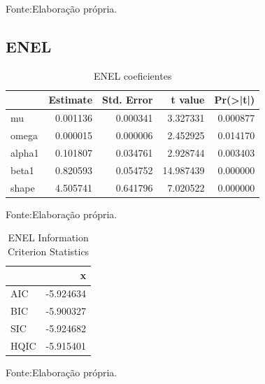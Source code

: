 \documentclass[
  12pt,
  a4paper,
  openany]{book}
\begin{document}
Fonte:Elaboração própria.

\justifying
\bigskip

\hypertarget{enel}{%
\subsection{ENEL}\label{enel}}

\begin{table}[!h]

\caption{\label{tab:unnamed-chunk-22}ENEL coeficientes}
\centering
\begin{tabular}[t]{lrrrr}
\toprule
  &  Estimate &  Std. Error &  t value & Pr(>|t|)\\
\midrule
mu & 0.001136 & 0.000341 & 3.327331 & 0.000877\\
omega & 0.000015 & 0.000006 & 2.452925 & 0.014170\\
alpha1 & 0.101807 & 0.034761 & 2.928744 & 0.003403\\
beta1 & 0.820593 & 0.054752 & 14.987439 & 0.000000\\
shape & 4.505741 & 0.641796 & 7.020522 & 0.000000\\
\bottomrule
\end{tabular}
\end{table}
\FloatBarrier
\centering

Fonte:Elaboração própria.

\justifying
\bigskip

\begin{table}[!h]

\caption{\label{tab:unnamed-chunk-23}ENEL Information Criterion Statistics}
\centering
\begin{tabular}[t]{lr}
\toprule
  & x\\
\midrule
AIC & -5.924634\\
BIC & -5.900327\\
SIC & -5.924682\\
HQIC & -5.915401\\
\bottomrule
\end{tabular}
\end{table}
\FloatBarrier
\centering

Fonte:Elaboração própria.

\justifying
\bigskip
\end{document}
